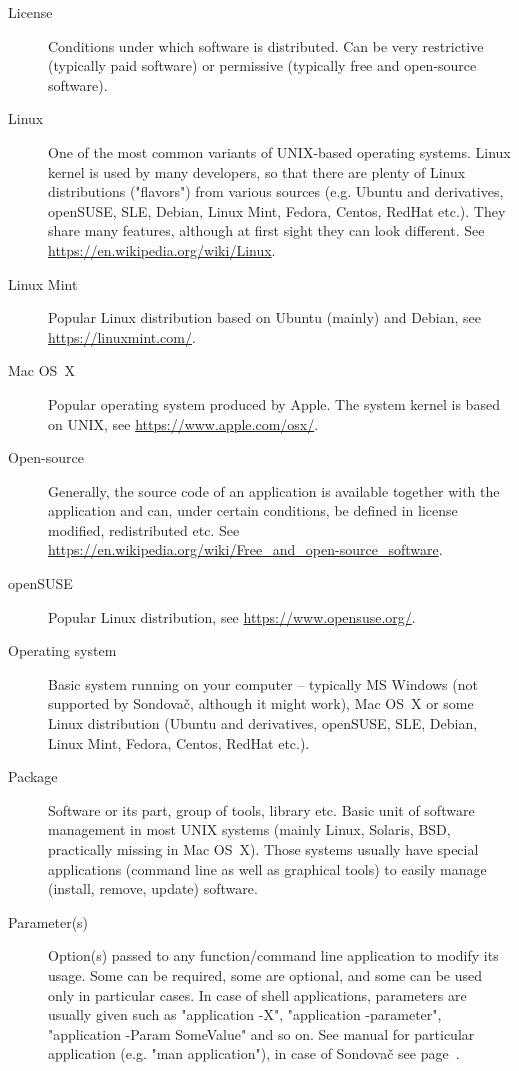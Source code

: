 \documentclass[a4paper, 11pt, twoside]{article}
\begin{document}
\begin{description}
  \item[License] Conditions under which software is distributed. Can be very restrictive (typically paid software) or permissive (typically free and open-source software).
  \item[Linux] One of the most common variants of UNIX-based operating systems. Linux kernel is used by many developers, so that there are plenty of Linux distributions ("flavors") from various sources (e.g. Ubuntu and derivatives, openSUSE, SLE, Debian, Linux Mint, Fedora, Centos, RedHat etc.). They share many features, although at first sight they can look different. See \url{https://en.wikipedia.org/wiki/Linux}.
  \item[Linux Mint] Popular Linux distribution based on Ubuntu (mainly) and Debian, see \url{https://linuxmint.com/}.
  \item[Mac OS~X] Popular operating system produced by Apple. The system kernel is based on UNIX, see \url{https://www.apple.com/osx/}.
  \item[Open-source] Generally, the source code of an application is available together with the application and can, under certain conditions, be defined in license modified, redistributed etc. See \url{https://en.wikipedia.org/wiki/Free_and_open-source_software}.
  \item[openSUSE] Popular Linux distribution, see \url{https://www.opensuse.org/}.
  \item[Operating system] Basic system running on your computer -- typically MS Windows (not supported by Sondovač, although it might work), Mac OS~X or some Linux distribution (Ubuntu and derivatives, openSUSE, SLE, Debian, Linux Mint, Fedora, Centos, RedHat etc.).
  \item[Package] Software or its part, group of tools, library etc. Basic unit of software management in most UNIX systems (mainly Linux, Solaris, BSD, practically missing in Mac OS~X). Those systems usually have special applications (command line as well as graphical tools) to easily manage (install, remove, update) software.
  \item[Parameter(s)] Option(s) passed to any function/command line application to modify its usage. Some can be required, some are optional, and some can be used only in particular cases. In case of shell applications, parameters are usually given such as "application -X", "application -parameter", "application -Param SomeValue" and so on. See manual for particular application (e.g. "man application"), in case of Sondovač see page~\pageref{script-usage}.

\end{description}
\end{document}
